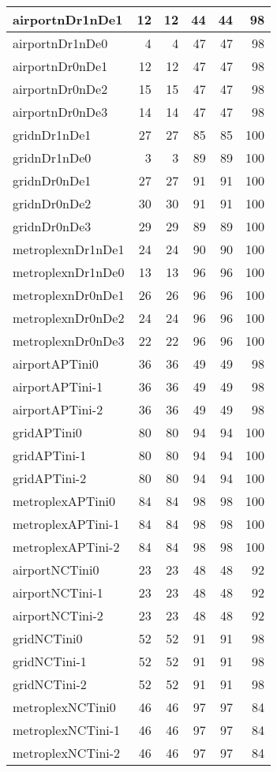 \begin{longtable}{|l|r|r|r|r|r|}
\endlastfoot
airportnDr1nDe1 & 12 & 12 & 44 & 44 & 98 \\ \hline
airportnDr1nDe0 & 4 & 4 & 47 & 47 & 98 \\ \hline
airportnDr0nDe1 & 12 & 12 & 47 & 47 & 98 \\ \hline
airportnDr0nDe2 & 15 & 15 & 47 & 47 & 98 \\ \hline
airportnDr0nDe3 & 14 & 14 & 47 & 47 & 98 \\ \hline
gridnDr1nDe1 & 27 & 27 & 85 & 85 & 100 \\ \hline
gridnDr1nDe0 & 3 & 3 & 89 & 89 & 100 \\ \hline
gridnDr0nDe1 & 27 & 27 & 91 & 91 & 100 \\ \hline
gridnDr0nDe2 & 30 & 30 & 91 & 91 & 100 \\ \hline
gridnDr0nDe3 & 29 & 29 & 89 & 89 & 100 \\ \hline
metroplexnDr1nDe1 & 24 & 24 & 90 & 90 & 100 \\ \hline
metroplexnDr1nDe0 & 13 & 13 & 96 & 96 & 100 \\ \hline
metroplexnDr0nDe1 & 26 & 26 & 96 & 96 & 100 \\ \hline
metroplexnDr0nDe2 & 24 & 24 & 96 & 96 & 100 \\ \hline
metroplexnDr0nDe3 & 22 & 22 & 96 & 96 & 100 \\ \hline
airportAPTini0 & 36 & 36 & 49 & 49 & 98 \\ \hline
airportAPTini-1 & 36 & 36 & 49 & 49 & 98 \\ \hline
airportAPTini-2 & 36 & 36 & 49 & 49 & 98 \\ \hline
gridAPTini0 & 80 & 80 & 94 & 94 & 100 \\ \hline
gridAPTini-1 & 80 & 80 & 94 & 94 & 100 \\ \hline
gridAPTini-2 & 80 & 80 & 94 & 94 & 100 \\ \hline
metroplexAPTini0 & 84 & 84 & 98 & 98 & 100 \\ \hline
metroplexAPTini-1 & 84 & 84 & 98 & 98 & 100 \\ \hline
metroplexAPTini-2 & 84 & 84 & 98 & 98 & 100 \\ \hline
airportNCTini0 & 23 & 23 & 48 & 48 & 92 \\ \hline
airportNCTini-1 & 23 & 23 & 48 & 48 & 92 \\ \hline
airportNCTini-2 & 23 & 23 & 48 & 48 & 92 \\ \hline
gridNCTini0 & 52 & 52 & 91 & 91 & 98 \\ \hline
gridNCTini-1 & 52 & 52 & 91 & 91 & 98 \\ \hline
gridNCTini-2 & 52 & 52 & 91 & 91 & 98 \\ \hline
metroplexNCTini0 & 46 & 46 & 97 & 97 & 84 \\ \hline
metroplexNCTini-1 & 46 & 46 & 97 & 97 & 84 \\ \hline
metroplexNCTini-2 & 46 & 46 & 97 & 97 & 84 \\ \hline
\end{longtable}
